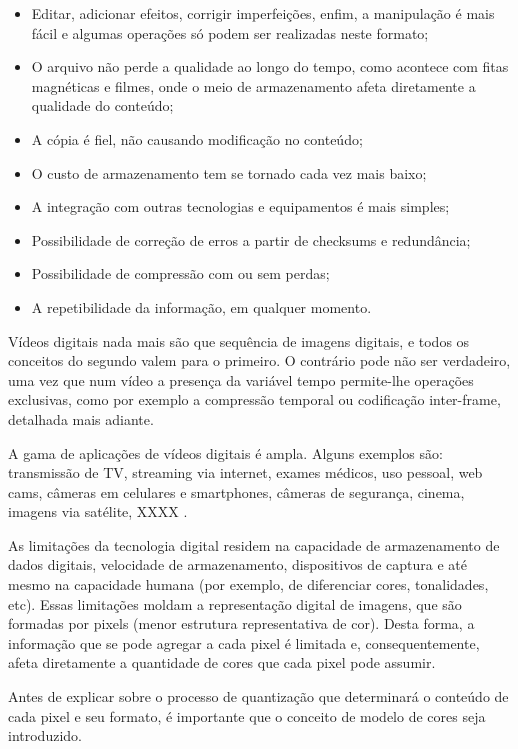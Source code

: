 \begin{itemize}
	\item Editar, adicionar efeitos, corrigir imperfeições, enfim, a manipulação é mais fácil e algumas operações só podem ser realizadas neste formato;
	\item O arquivo não perde a qualidade ao longo do tempo, como acontece com fitas magnéticas e filmes, onde o meio de armazenamento afeta diretamente a qualidade do conteúdo;
	\item A cópia é fiel, não causando modificação no conteúdo;
	\item O custo de armazenamento tem se tornado cada vez mais baixo;
	\item A integração com outras tecnologias e equipamentos é mais simples;
	\item Possibilidade de correção de erros a partir de checksums e redundância;
	\item Possibilidade de compressão com ou sem perdas;
	\item A repetibilidade da informação, em qualquer momento.
\end{itemize}

Vídeos digitais nada mais são que sequência de imagens digitais, e todos os conceitos do segundo valem para o primeiro. O contrário pode não ser verdadeiro, uma vez que num vídeo a presença da variável tempo permite-lhe operações exclusivas, como por exemplo a compressão temporal ou codificação inter-frame, detalhada mais adiante.

A gama de aplicações de vídeos digitais é ampla. Alguns exemplos são: transmissão de TV, streaming via internet, exames médicos, uso pessoal, web cams, câmeras em celulares e smartphones, câmeras de segurança, cinema, imagens via satélite, XXXX .

As limitações da tecnologia digital residem na capacidade de armazenamento de dados digitais, velocidade de armazenamento, dispositivos de captura e até mesmo na capacidade humana (por exemplo, de diferenciar cores, tonalidades, etc). Essas limitações moldam a representação digital de imagens, que são formadas por pixels (menor estrutura representativa de cor). Desta forma, a informação que se pode agregar a cada pixel é limitada e, consequentemente, afeta diretamente a quantidade de cores que cada pixel pode assumir.

Antes de explicar sobre o processo de quantização que determinará o conteúdo de cada pixel e seu formato, é importante que o conceito de modelo de cores seja introduzido.

